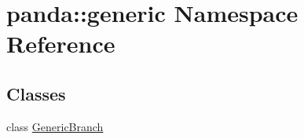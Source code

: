 \hypertarget{namespacepanda_1_1generic}{
\section{panda::generic Namespace Reference}
\label{namespacepanda_1_1generic}
}
\subsection*{Classes}
\begin{DoxyCompactItemize}
\item 
class \hyperlink{classpanda_1_1generic_1_1GenericBranch}{GenericBranch}
\end{DoxyCompactItemize}
